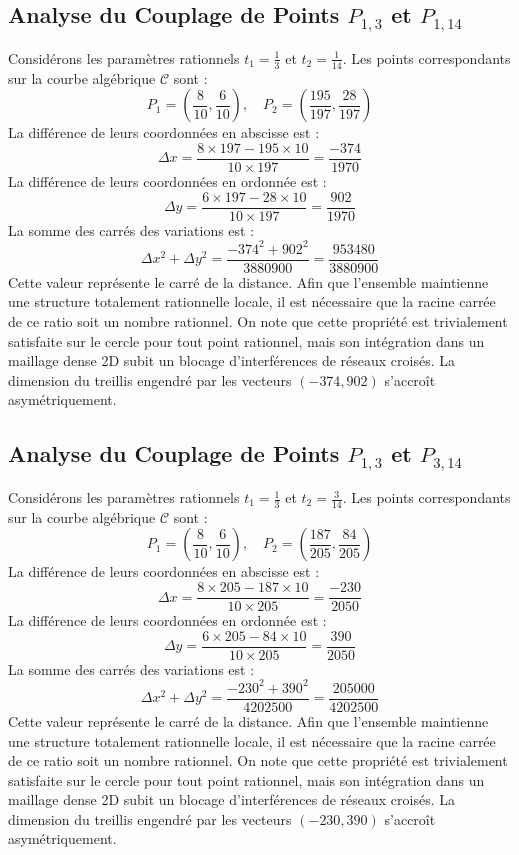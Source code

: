 \documentclass[12pt, a4paper]{article}
\begin{document}
\subsection{Analyse du Couplage de Points $P_{1,3}$ et $P_{1,14}$}
Considérons les paramètres rationnels $t_1 = \frac{1}{3}$ et $t_2 = \frac{1}{14}$.
Les points correspondants sur la courbe algébrique $\mathcal{C}$ sont :
$$ P_1 = \left( \frac{8}{10}, \frac{6}{10} \right), \quad P_2 = \left( \frac{195}{197}, \frac{28}{197} \right) $$
La différence de leurs coordonnées en abscisse est :
$$ \Delta x = \frac{8 \times 197 - 195 \times 10}{10 \times 197} = \frac{-374}{1970} $$
La différence de leurs coordonnées en ordonnée est :
$$ \Delta y = \frac{6 \times 197 - 28 \times 10}{10 \times 197} = \frac{902}{1970} $$
La somme des carrés des variations est :
$$ \Delta x^2 + \Delta y^2 = \frac{ -374^2 + 902^2 }{ 3880900 } = \frac{ 953480 }{ 3880900 } $$
Cette valeur représente le carré de la distance. Afin que l'ensemble maintienne une structure totalement rationnelle locale, il est nécessaire que la racine carrée de ce ratio soit un nombre rationnel. On note que cette propriété est trivialement satisfaite sur le cercle pour tout point rationnel, mais son intégration dans un maillage dense 2D subit un blocage d'interférences de réseaux croisés. La dimension du treillis engendré par les vecteurs $( -374, 902 )$ s'accroît asymétriquement.


\subsection{Analyse du Couplage de Points $P_{1,3}$ et $P_{3,14}$}
Considérons les paramètres rationnels $t_1 = \frac{1}{3}$ et $t_2 = \frac{3}{14}$.
Les points correspondants sur la courbe algébrique $\mathcal{C}$ sont :
$$ P_1 = \left( \frac{8}{10}, \frac{6}{10} \right), \quad P_2 = \left( \frac{187}{205}, \frac{84}{205} \right) $$
La différence de leurs coordonnées en abscisse est :
$$ \Delta x = \frac{8 \times 205 - 187 \times 10}{10 \times 205} = \frac{-230}{2050} $$
La différence de leurs coordonnées en ordonnée est :
$$ \Delta y = \frac{6 \times 205 - 84 \times 10}{10 \times 205} = \frac{390}{2050} $$
La somme des carrés des variations est :
$$ \Delta x^2 + \Delta y^2 = \frac{ -230^2 + 390^2 }{ 4202500 } = \frac{ 205000 }{ 4202500 } $$
Cette valeur représente le carré de la distance. Afin que l'ensemble maintienne une structure totalement rationnelle locale, il est nécessaire que la racine carrée de ce ratio soit un nombre rationnel. On note que cette propriété est trivialement satisfaite sur le cercle pour tout point rationnel, mais son intégration dans un maillage dense 2D subit un blocage d'interférences de réseaux croisés. La dimension du treillis engendré par les vecteurs $( -230, 390 )$ s'accroît asymétriquement.
\end{document}
